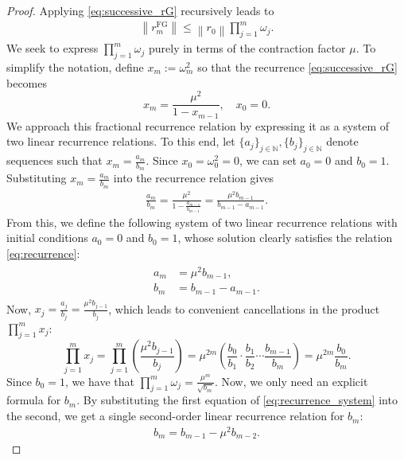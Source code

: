 \documentclass[10pt,a4paper]{amsart}
\def\N{\mathbb{N}}
\begin{document}
\begin{proof}
    Applying \eqref{eq:successive_rG} recursively leads to
    \begin{align} \label{eq:bound}
        \left\|r_m^{\mathrm{FG}}\right\| \leq \left\|r_0\right\| \prod_{j=1}^m \omega_j.
    \end{align}
    We seek to express $ \prod_{j=1}^m \omega_j$ purely in terms of the contraction factor $\mu$. To simplify the notation, define $x_m := \omega_m^2$ so that the recurrence \eqref{eq:successive_rG} becomes
    $$x_m = \frac{\mu^2}{1 - x_{m-1}}, \quad x_0 = 0.$$
    We approach this fractional recurrence relation by expressing it as a system of two linear recurrence relations. To this end, let $\{a_j\}_{j \in \N}, \{b_j\}_{j \in \N}$ denote sequences such that $x_m = \frac{a_m}{b_m}$. Since $x_0 = \omega_0^2 = 0$, we can set $a_0 = 0$ and $b_0 = 1$. Substituting $x_m = \frac{a_m}{b_m}$ into the recurrence relation gives
    \begin{align} \label{eq:recurrence}
        \frac{a_m}{b_m} = \frac{\mu^2}{1 - \frac{a_{m-1}}{b_{m-1}}} = \frac{\mu^2 b_{m-1}}{b_{m-1} - a_{m-1}}.
    \end{align}
    From this, we define the following system of two linear recurrence relations with initial conditions $a_0 = 0$ and $b_0 = 1$, whose solution clearly satisfies the relation \eqref{eq:recurrence}:
    \begin{align} \label{eq:recurrence_system}
        \begin{aligned}
            a_m & = \mu^2 b_{m-1},     \\
            b_m & = b_{m-1} - a_{m-1}.
        \end{aligned}
    \end{align}
    Now, $x_j = \frac{a_j}{b_j} = \frac{\mu^2 b_{j-1}}{b_j}$, which leads to convenient cancellations in the product $\prod_{j=1}^m x_j$:
    $$\prod_{j=1}^m x_j = \prod_{j=1}^m \left( \frac{\mu^2 b_{j-1}}{b_j} \right) = \mu^{2m} \left( \frac{b_0}{b_1} \cdot \frac{b_1}{b_2} \cdots \frac{b_{m-1}}{b_m} \right) = \mu^{2m} \frac{b_0}{b_m}.$$
    Since $b_0=1$, we have that $\prod_{j=1}^m \omega_j = \frac{\mu^m}{\sqrt{b_m}}.$
    Now, we only need an explicit formula for $b_m$. By substituting the first equation of \eqref{eq:recurrence_system} into the second, we get a single second-order linear recurrence relation for $b_m$:
    \begin{align} \label{eq:2nd_order_recurrence}
        b_m = b_{m-1} - \mu^2 b_{m-2}.
    \end{align}

\end{proof}
\end{document}
